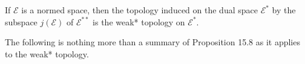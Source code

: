 If $\mathcal{E}$ is a normed space, then the topology induced on the dual space $\mathcal{E}^*$ by the subspace $j(\mathcal{E})$ of $\mathcal{E}^{**}$ is the weak* topology on $\mathcal{E}^*$.

The following is nothing more than a summary of Proposition 15.8 as it applies to the weak* topology.
